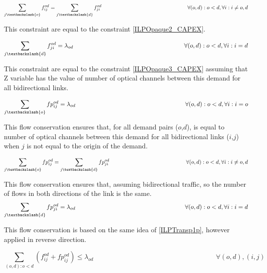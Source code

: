 \begin{equation}
\sum_{j\textbackslash \{o\}} f_{ij}^{od} = \sum_{j\textbackslash \{d\}} f_{ji}^{od} \qquad \qquad \qquad \qquad \qquad \qquad \qquad \qquad
\forall(o,d) : o < d, \forall i: i \neq o,d
\label{ILPTransp2}
\end{equation}

This constraint are equal to the constraint \ref{ILPOpaque2_CAPEX}.

\begin{equation}
\sum_{j\textbackslash \{d\}} f_{ji}^{od} = \lambda_{od}  \qquad \qquad \qquad \qquad \qquad \qquad \qquad \qquad \qquad
\forall(o,d) : o < d, \forall i: i = d
\label{ILPTransp3}
\end{equation}

This constraint are equal to the constraint \ref{ILPOpaque3_CAPEX} assuming that Z variable has the value of number of optical channels between this demand for all bidirectional links.

\begin{equation}
\sum_{j\textbackslash \{o\}} fp_{ij}^{od} = \lambda_{od} \qquad \qquad \qquad \qquad \qquad \qquad \qquad \qquad \qquad
\forall(o,d) : o < d, \forall i: i = o
\label{ILPTransp1p}
\end{equation}

This flow conservation ensures that, for all demand pairs ($o$,$d$), is equal to number of optical channels between this demand for all bidirectional links ($i$,$j$) when $j$ is not equal to the origin of the demand.

\begin{equation}
\sum_{j\textbackslash \{o\}} fp_{ij}^{od} = \sum_{j\textbackslash \{d\}} fp_{ji}^{od} \qquad \qquad \qquad \qquad \qquad \qquad \qquad
\forall(o,d) : o < d, \forall i: i \neq o,d
\label{ILPTransp2p}
\end{equation}

This flow conservation ensures that, assuming bidirectional traffic, so the number of flows in both directions of the link is the same.
\newpage
\begin{equation}
\sum_{j\textbackslash \{d\}} fp_{ji}^{od} = \lambda_{od} \qquad \qquad \qquad \qquad \qquad \qquad \qquad \qquad \qquad
\forall(o,d) : o < d, \forall i: i = d
\label{ILPTransp3p}
\end{equation}

This flow conservation is based on the same idea of \ref{ILPTransp1p}, however applied in reverse direction.

\begin{equation}
\sum_{(o,d):o<d} \left(f_{ij}^{od}  + fp_{ij}^{od}\right) \leq \lambda_{od}  \qquad \qquad \qquad \qquad \qquad \qquad \qquad \qquad \qquad
\forall (o,d), (i,j)
\label{ILPTransp4p}
\end{equation}

